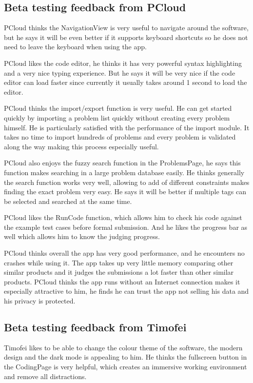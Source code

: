 \documentclass[report.tex]{subfiles}
\begin{document}
\subsection{Beta testing feedback from PCloud}

PCloud thinks the NavigationView is very useful to navigate around the software, but he says it will be even better if it supports keyboard shortcuts so he does not need to leave the keyboard when using the app.

PCloud likes the code editor, he thinks it has very powerful syntax highlighting and a very nice typing experience. But he says it will be very nice if the code editor can load faster since currently it usually takes around 1 second to load the editor.

PCloud thinks the import/export function is very useful. He can get started quickly by importing a problem list quickly without creating every problem himself. He is particularly satisfied with the performance of the import module. It takes no time to import hundreds of problems and every problem is validated along the way making this process especially useful.

PCloud also enjoys the fuzzy search function in the ProblemsPage, he says this function makes searching in a large problem database easily. He thinks generally the search function works very well, allowing to add of different constraints makes finding the exact problem very easy. He says it will be better if multiple tags can be selected and searched at the same time.

PCloud likes the RunCode function, which allows him to check his code against the example test cases before formal submission. And he likes the progress bar as well which allows him to know the judging progress.

PCloud thinks overall the app has very good performance, and he encounters no crashes while using it. The app takes up very little memory comparing other similar products and it judges the submissions a lot faster than other similar products. PCloud thinks the app runs without an Internet connection makes it especially attractive to him, he finds he can trust the app not selling his data and his privacy is protected.

\subsection{Beta testing feedback from Timofei}

Timofei likes to be able to change the colour theme of the software, the modern design and the dark mode is appealing to him. He thinks the fullscreen button in the CodingPage is very helpful, which creates an immersive working environment and remove all distractions.
\end{document}
